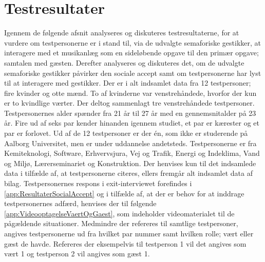 \chapter{Testresultater}
\label{TestresultaterSocialAccept}
%
Igennem de følgende afsnit analyseres og diskuteres testresultaterne, for at vurdere om testpersonerne er i stand til, via de udvalgte semaforiske gestikker, at interagere med et musikanlæg som en sideløbende opgave til den primær opgave; samtalen med gæsten. Derefter analyseres og diskuteres det, om de udvalgte semaforiske gestikker påvirker den sociale accept samt om testpersonerne har lyst til at interagere med gestikker.\blankline
%
Der er i alt indsamlet data fra 12 testpersoner; fire kvinder og otte mænd. To af kvinderne var venstrehåndede, hvorfor der kun er to kvindlige værter. Der deltog sammenlagt tre venstrehåndede testpersoner. Testpersonernes alder spænder fra 21 år til 27 år med en gennemsnitalder på 23 år. Fire ud af seks par kender hinanden igennem studiet, et par er kærester og et par er forlovet. Ud af de 12 testpersoner er der én, som ikke er studerende på Aalborg Universitet, men er under uddannelse andetsteds. Testpersonerne er fra Kemiteknologi, Software, Erhvervsjura, Vej og Trafik, Energi og Indeklima, Vand og Miljø, Lærerseminariet og Konstruktion. Der henvises kun til det indsamlede data i tilfælde af, at testpersonerne citeres, ellers fremgår alt indsamlet data af bilag. Testpersonernes respons i exit-interviewet forefindes i \autoref{app:ResultaterSocialAccept} og i tilfælde af, at der er behov for at inddrage testpersonernes adfærd, henvises der til følgende \autoref{app:VideooptagelseVaertOgGaest}, som indeholder videomaterialet til de pågældende situationer. Medmindre der refereres til samtlige testpersoner, angives testpersonerne ud fra hvilket par nummer samt hvilken rolle; vært eller gæst de havde. Refereres der eksempelvis til testperson 1 vil det angives som vært 1 og testperson 2 vil angives som gæst 1. 



